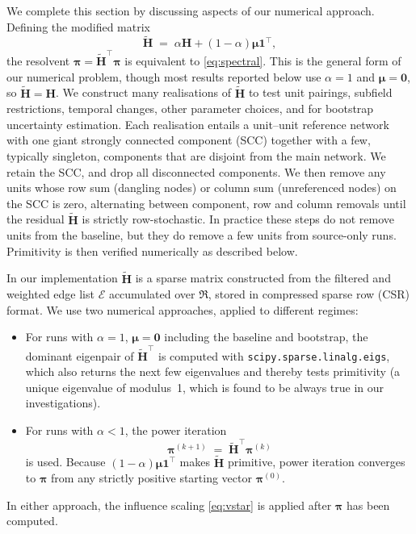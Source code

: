 We complete this section by discussing aspects of our numerical approach. Defining the modified matrix
\begin{equation}
	\mathbf{\tilde{H}}
	\;=\;
	\alpha\mathbf{H}+(1-\alpha)\boldsymbol{\mu}\mathbf{1}^\top,
	\label{eq:Hstar}
\end{equation}
the resolvent
$\boldsymbol{\pi}=\mathbf{\tilde{H}}^{\top}\boldsymbol{\pi}$
is equivalent to \eqref{eq:spectral}. This is the general form of
our numerical problem, though most results reported below use $\alpha=1$ and $\boldsymbol{\mu}=\mathbf{0}$, so $\mathbf{\tilde{H}}=\mathbf{H}$.
We construct many realisations of $\mathbf{\tilde{H}}$ to test unit pairings, subfield restrictions, temporal changes, other parameter choices, and for bootstrap uncertainty estimation. Each realisation entails a unit--unit reference network with one giant strongly connected component (SCC) together with a few, typically singleton, components that are disjoint from the main network. We retain the SCC, and drop all disconnected components. We then remove any units whose row sum (dangling nodes) or column sum (unreferenced nodes) on the SCC is zero, alternating between component, row and column removals until the residual $\mathbf{\tilde{H}}$ is strictly row-stochastic. In practice these steps do not remove units from the baseline, but they do remove a few units from source-only runs. Primitivity is then verified numerically as described below.

In our implementation $\mathbf{\tilde{H}}$ is a sparse matrix constructed from the filtered and weighted edge list $\mathcal{E}$ accumulated over $\mathfrak{R}$, stored in compressed sparse row (CSR) format. We use two numerical approaches, applied to different regimes:
\begin{itemize}
	\setlength{\itemsep}{0pt}
	\item For runs with $\alpha=1$, $\boldsymbol{\mu}=\mathbf{0}$ including the baseline and bootstrap, the dominant eigenpair of $\mathbf{\tilde{H}}^\top$ is computed with \texttt{scipy.sparse.linalg.eigs}, which also returns the next few eigenvalues and thereby tests primitivity (a unique eigenvalue of modulus~1, which is found to be always true in our investigations).
	\item For runs with $\alpha<1$, the power iteration
		\begin{equation}
			\boldsymbol{\pi}^{(k+1)}
			\;=\;
			\mathbf{\tilde{H}}^{\top}\boldsymbol{\pi}^{(k)}
			\label{eq:power}
		\end{equation}
is used. Because $(1-\alpha)\boldsymbol{\mu}\mathbf{1}^\top$ makes $\mathbf{\tilde{H}}$ primitive, power iteration converges to $\boldsymbol{\pi}$ from any strictly positive starting vector $\boldsymbol{\pi}^{(0)}$.
\end{itemize}
In either approach, the influence scaling \eqref{eq:vstar} is applied after $\boldsymbol{\pi}$ has been computed.
